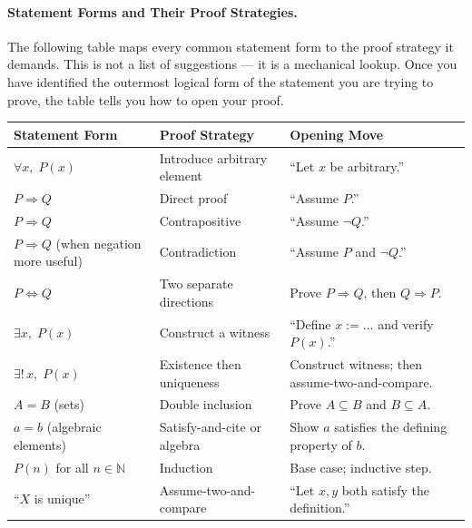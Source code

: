 \paragraph{Statement Forms and Their Proof Strategies.}

The following table maps every common statement form to the proof
strategy it demands. This is not a list of suggestions --- it is a
mechanical lookup. Once you have identified the outermost logical
form of the statement you are trying to prove, the table tells you
how to open your proof.

\begin{center}
\renewcommand{\arraystretch}{1.4}
\begin{tabular}{p{} p{} p{}}
\toprule
\textbf{Statement Form} & \textbf{Proof Strategy} & \textbf{Opening Move} \\
\midrule
$\forall x,\; P(x)$ &
  Introduce arbitrary element &
  ``Let $x$ be arbitrary.'' \\

$P \Rightarrow Q$ &
  Direct proof &
  ``Assume $P$.'' \\

$P \Rightarrow Q$ &
  Contrapositive &
  ``Assume $\neg Q$.'' \\

$P \Rightarrow Q$
(when negation more useful) &
  Contradiction &
  ``Assume $P$ and $\neg Q$.'' \\

$P \Leftrightarrow Q$ &
  Two separate directions &
  Prove $P \Rightarrow Q$, then $Q \Rightarrow P$. \\

$\exists x,\; P(x)$ &
  Construct a witness &
  ``Define $x := \ldots$ and verify $P(x)$.'' \\

$\exists!\, x,\; P(x)$ &
  Existence then uniqueness &
  Construct witness; then assume-two-and-compare. \\

$A = B$ (sets) &
  Double inclusion &
  Prove $A \subseteq B$ and $B \subseteq A$. \\

$a = b$ (algebraic elements) &
  Satisfy-and-cite or algebra &
  Show $a$ satisfies the defining property of $b$. \\

$P(n)$ for all $n \in \mathbb{N}$ &
  Induction &
  Base case; inductive step. \\

``$X$ is unique'' &
  Assume-two-and-compare &
  ``Let $x, y$ both satisfy the definition.'' \\
\bottomrule
\end{tabular}
\end{center}

